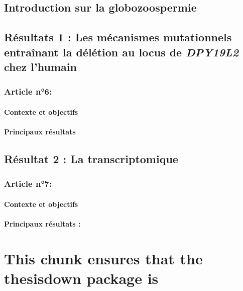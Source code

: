 \documentclass[12pt,a4paper,twoside]{ugathesis}
\begin{document}
\section{Introduction sur la
globozoospermie}\label{introduction-sur-la-globozoospermie}

\section{\texorpdfstring{Résultats 1 : Les mécanismes mutationnels
entraînant la délétion au locus de \emph{DPY19L2} chez
l'humain}{Résultats 1 : Les mécanismes mutationnels entraînant la délétion au locus de DPY19L2 chez l'humain}}\label{mecamut}

\subsection{Article n°6:}\label{article-n6}

\subsubsection{Contexte et objectifs}\label{contexte-et-objectifs-5}

\subsubsection{Principaux résultats}\label{principaux-resultats-5}

\section{Résultat 2 : La transcriptomique}\label{transcriptome}

\subsection{Article n°7:}\label{article-n7}

\subsubsection{Contexte et objectifs}\label{contexte-et-objectifs-6}

\subsubsection{Principaux résultats :}\label{principaux-resultats-6}

\chapter{This chunk ensures that the thesisdown package
is}\label{this-chunk-ensures-that-the-thesisdown-package-is}
\end{document}
